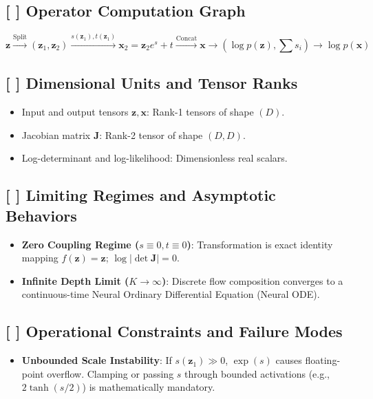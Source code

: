 \documentclass[11pt,a4paper]{article}
\theoremstyle{definition}
\begin{document}
\subsection{[ ] Operator Computation Graph}
{\boldmath
\begin{equation}
\mathbf{z} \xrightarrow{\text{Split}} (\mathbf{z}_1, \mathbf{z}_2) \xrightarrow{s(\mathbf{z}_1), t(\mathbf{z}_1)} \mathbf{x}_2 = \mathbf{z}_2 e^s + t \xrightarrow{\text{Concat}} \mathbf{x} \longrightarrow (\log p(\mathbf{z}), \sum s_i) \to \log p(\mathbf{x})
\end{equation}
}

\subsection{[ ] Dimensional Units and Tensor Ranks}
\begin{itemize}
    \item Input and output tensors $\mathbf{z}, \mathbf{x}$: Rank-1 tensors of shape $(D)$.
    \item Jacobian matrix $\mathbf{J}$: Rank-2 tensor of shape $(D, D)$.
    \item Log-determinant and log-likelihood: Dimensionless real scalars.
\end{itemize}

\subsection{[ ] Limiting Regimes and Asymptotic Behaviors}
\begin{itemize}
    \item \textbf{Zero Coupling Regime ($s \equiv 0, t \equiv 0$)}: Transformation is exact identity mapping $f(\mathbf{z}) = \mathbf{z}$; $\log |\det \mathbf{J}| = 0$.
    \item \textbf{Infinite Depth Limit ($K \to \infty$)}: Discrete flow composition converges to a continuous-time Neural Ordinary Differential Equation (Neural ODE).
\end{itemize}

\subsection{[ ] Operational Constraints and Failure Modes}
\begin{itemize}
    \item \textbf{Unbounded Scale Instability}: If $s(\mathbf{z}_1) \gg 0$, $\exp(s)$ causes floating-point overflow. Clamping or passing $s$ through bounded activations (e.g., $2 \tanh(s / 2)$) is mathematically mandatory.
\end{itemize}
\end{document}
